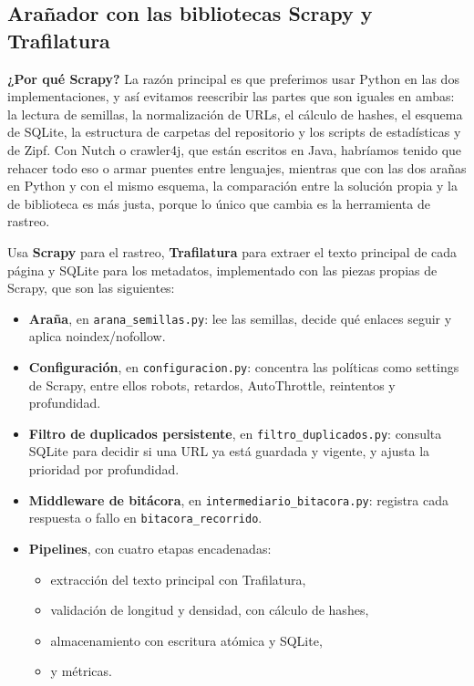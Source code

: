 \documentclass[11pt,spanish]{article}
\begin{document}
\subsection{Arañador con las bibliotecas Scrapy y Trafilatura}

\textbf{¿Por qué Scrapy?} La razón principal es que preferimos usar Python en las dos implementaciones, y así evitamos reescribir las partes que son iguales en ambas: la lectura de semillas, la normalización de URLs, el cálculo de hashes, el esquema de SQLite, la estructura de carpetas del repositorio y los scripts de estadísticas y de Zipf. Con Nutch o crawler4j, que están escritos en Java, habríamos tenido que rehacer todo eso o armar puentes entre lenguajes, mientras que con las dos arañas en Python y con el mismo esquema, la comparación entre la solución propia y la de biblioteca es más justa, porque lo único que cambia es la herramienta de rastreo.

Usa \textbf{Scrapy} para el rastreo, \textbf{Trafilatura} para extraer el texto principal de cada página y SQLite para los metadatos, implementado con las piezas propias de Scrapy, que son las siguientes:

\begin{itemize}[label=\textbullet, leftmargin=*]
    \item \textbf{Araña}, en \texttt{arana\_semillas.py}: lee las semillas, decide qué enlaces seguir y aplica noindex/nofollow.
    \item \textbf{Configuración}, en \texttt{configuracion.py}: concentra las políticas como settings de Scrapy, entre ellos robots, retardos, AutoThrottle, reintentos y profundidad.
    \item \textbf{Filtro de duplicados persistente}, en \texttt{filtro\_duplicados.py}: consulta SQLite para decidir si una URL ya está guardada y vigente, y ajusta la prioridad por profundidad.
    \item \textbf{Middleware de bitácora}, en \texttt{intermediario\_bitacora.py}: registra cada respuesta o fallo en \texttt{bitacora\_recorrido}.
    \item \textbf{Pipelines}, con cuatro etapas encadenadas:
    \begin{itemize}[label=--, leftmargin=*]
        \item extracción del texto principal con Trafilatura,
        \item validación de longitud y densidad, con cálculo de hashes,
        \item almacenamiento con escritura atómica y SQLite,
        \item y métricas.
    \end{itemize}
\end{itemize}
\end{document}
